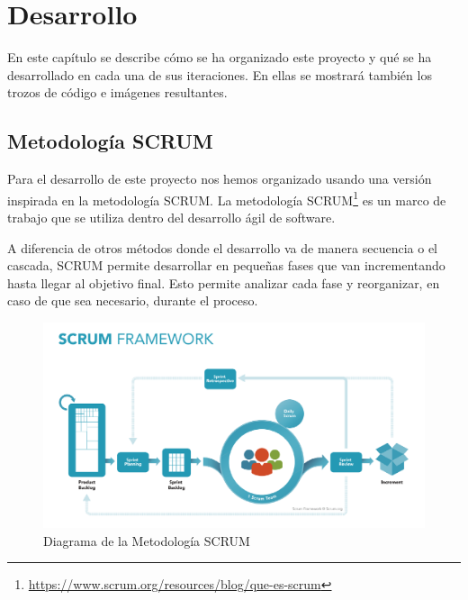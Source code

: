 \documentclass[a4paper, 12pt]{book}
\begin{document}

\cleardoublepage
\chapter{Desarrollo}
\label{sec:desarrollo} 

En este capítulo se describe cómo se ha organizado este proyecto y qué se ha desarrollado en cada una de sus iteraciones. En ellas se mostrará también los trozos de código e imágenes resultantes.


\section{Metodología SCRUM}
\label{sec:scrum}

 Para el desarrollo de este proyecto nos hemos organizado usando una versión inspirada en la metodología SCRUM\cite{sutherland:scrum}. La metodología SCRUM\footnote{\url{https://www.scrum.org/resources/blog/que-es-scrum}} es un marco de trabajo que se utiliza dentro del desarrollo ágil de software. 

A diferencia de otros métodos donde el desarrollo va de manera secuencia o el cascada, SCRUM permite desarrollar en pequeñas fases que van incrementando hasta llegar al objetivo final. Esto permite analizar cada fase y reorganizar, en caso de que sea necesario, durante el proceso. 

\begin{figure}[H]
  \centering
  \includegraphics[width=12cm, keepaspectratio]{img/development/scrum.png}
  \caption{Diagrama de la Metodología SCRUM}
  \label{fig:scrum}
\end{figure}
\end{document}
